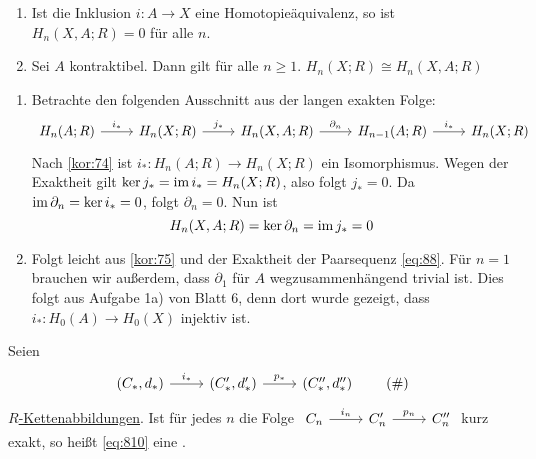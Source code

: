 \begin{korollar}[{name=[{Homologiemodul wenn $A$ kontraktibel ist}]}]
	\leavevmode
	\begin{enumerate}[(1)]
		\item Ist die Inklusion $i \colon A \to X$ eine Homotopieäquivalenz, so ist $H_n(X,A;R)= 0$ für alle $n$.
		\item Sei $A$ kontraktibel. Dann gilt für alle $n \ge 1$. $H_n(X;R) \cong H_n(X,A;R)$
	\end{enumerate}
\end{korollar}
\begin{beweis}
	\begin{enumerate}[(1)]
		\item Betrachte den folgenden Ausschnitt aus der langen exakten Folge:
		\[
			\begin{tikzcd}
				H_n(A;R) \rar["i_*"] & H_n(X;R) \rar["j_*"] & H_n(X,A;R) \rar["\partial_n"] & H_{n-1}(A;R) \rar["i_*"] & H_n(X;R)
			\end{tikzcd}
		\]
		Nach \autoref{kor:74} ist $i_* \colon H_n(A;R) \to H_n(X;R)$ ein Isomorphismus. Wegen der Exaktheit gilt
		$\ker j_* = \operatorname{im} i_* = H_n(X;R)$, also folgt $j_* = 0$. Da $\operatorname{im} \partial_n = \ker i_* = 0$, folgt $\partial_n=0$. Nun ist 
		\[
			H_n(X,A;R) = \ker \partial_n = \operatorname{im} j_* = 0
		\]
		\item Folgt leicht aus \autoref{kor:75} und der Exaktheit der Paarsequenz \eqref{eq:88}. Für $n=1$ brauchen wir außerdem, dass $\partial_1$ für $A$ wegzusammenhängend
		trivial ist. Dies folgt aus Aufgabe 1a) von Blatt 6, denn dort wurde gezeigt, dass $i_* \colon H_0(A) \to H_0(X)$ injektiv ist. \qedhere
	\end{enumerate}
\end{beweis}

\begin{definition}[{name=[Kurze exakte Folge von Kettenkomplexen]}]
	Seien 
	\begin{equation*}
		\begin{tikzcd}
			(C_*,d_*) \rar["i_*"] & (C_*',d_*') \rar["p_*"] & (C_*'',d_*'') 
		\end{tikzcd} \label{eq:810}\tag{\#}
	\end{equation*}
	\hyperref[def:61]{$R$-Kettenabbildungen}. Ist für jedes $n$ die Folge
	\(
		\begin{tikzcd}
			C_n \rar["i_n"] & C_n' \rar["p_n"] & C_n''
		\end{tikzcd}
	\)
	kurz exakt, so heißt \eqref{eq:810} eine .
\end{definition}

